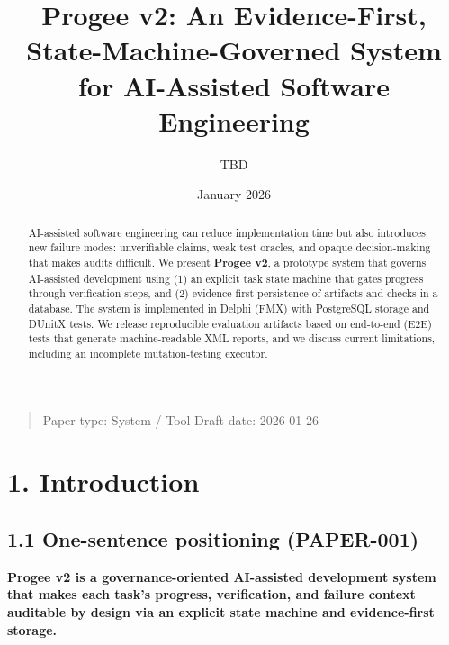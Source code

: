 \documentclass[11pt]{article}
\title{Progee v2: An Evidence-First, State-Machine-Governed System for AI-Assisted Software Engineering}
\author{TBD}
\date{January 2026}
\begin{document}
\maketitle
\begin{abstract}
AI-assisted software engineering can reduce implementation time but also introduces new failure modes: unverifiable claims, weak test oracles, and opaque decision-making that makes audits difficult. We present \textbf{Progee v2}, a prototype system that governs AI-assisted development using (1) an explicit task state machine that gates progress through verification steps, and (2) evidence-first persistence of artifacts and checks in a database. The system is implemented in Delphi (FMX) with PostgreSQL storage and DUnitX tests. We release reproducible evaluation artifacts based on end-to-end (E2E) tests that generate machine-readable XML reports, and we discuss current limitations, including an incomplete mutation-testing executor.
\end{abstract}

\begin{quote}
Paper type: System / Tool
Draft date: 2026-01-26
\end{quote}

\section{1. Introduction}
\subsection{1.1 One-sentence positioning (PAPER-001)}
\textbf{Progee v2 is a governance-oriented AI-assisted development system that makes each task’s progress, verification, and failure context auditable by design via an explicit state machine and evidence-first storage.}
\end{document}
